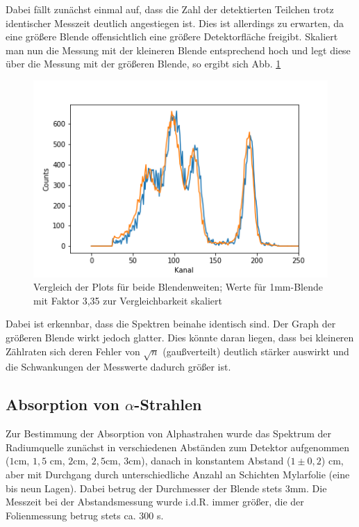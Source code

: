 Dabei fällt zunächst einmal auf, dass die Zahl der detektierten Teilchen trotz identischer Messzeit deutlich angestiegen ist. Dies ist 
allerdings zu erwarten, da eine größere Blende offensichtlich eine größere Detektorfläche freigibt. Skaliert man nun die Messung 
mit der kleineren Blende entsprechend hoch und legt diese über die Messung mit der größeren Blende, so ergibt sich Abb. 
\ref{bild:blendebeide}

\begin{figure}[h]
    \centering
    \includegraphics[scale=0.65]{Bilder/blendebeide.png}
    \caption{Vergleich der Plots für beide Blendenweiten; Werte für 1mm-Blende mit Faktor 3,35 zur Vergleichbarkeit skaliert}
    \label{bild:blendebeide}
\end{figure}

Dabei ist erkennbar, dass die Spektren beinahe identisch sind. Der Graph der größeren Blende wirkt jedoch glatter. Dies könnte 
daran liegen, dass bei kleineren Zählraten sich deren Fehler von $\sqrt{n}$ (gaußverteilt) deutlich stärker auswirkt und die Schwankungen der 
Messwerte dadurch größer ist.


\subsection{Absorption von $\alpha$-Strahlen}
\label{subs:abs}

Zur Bestimmung der Absorption von Alphastrahen wurde das Spektrum der Radiumquelle zunächst in verschiedenen Abständen zum Detektor 
aufgenommen ($1$cm, $1,5$ cm, $2$cm, $2,5$cm, $3$cm), danach in konstantem Abstand ($1 \pm 0,2$) cm, aber mit Durchgang durch 
unterschiedliche Anzahl an Schichten Mylarfolie (eine bis neun Lagen). 
Dabei betrug der Durchmesser der Blende stets $3$mm. Die Messzeit bei der Abstandsmessung wurde i.d.R. immer größer, die der 
Folienmessung betrug stets ca. $300$ s.\\


